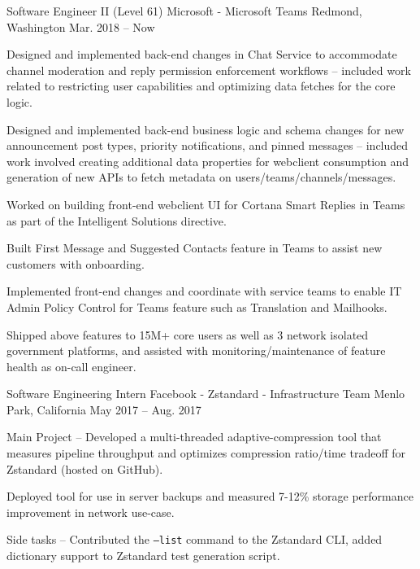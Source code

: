 \begin{cventries}
  \cventry
    {Software Engineer II (Level 61)}
    {Microsoft - Microsoft Teams}
    {Redmond, Washington}
    {Mar. 2018 -- Now}
    {
      \begin{cvitems}
        \item {Designed and implemented back-end changes in Chat Service to accommodate channel moderation and reply permission enforcement workflows -- included work related to restricting user capabilities and optimizing data fetches for the core logic.}
        \item {Designed and implemented back-end business logic and schema changes for new announcement post types, priority notifications, and pinned messages -- included work involved creating additional data properties for webclient consumption and generation of new APIs to fetch metadata on users/teams/channels/messages.}
        \item {Worked on building front-end webclient UI for Cortana Smart Replies in Teams as part of the Intelligent Solutions directive.}
        \item {Built First Message and Suggested Contacts feature in Teams to assist new customers with onboarding.}
        \item {Implemented front-end changes and coordinate with service teams to enable IT Admin Policy Control for Teams feature such as Translation and Mailhooks.}
        \item {Shipped above features to 15M+ core users as well as 3 network isolated government platforms, and assisted with monitoring/maintenance of feature health as on-call engineer.}
      \end{cvitems}
    }
  \cventry
    {Software Engineering Intern}
    {Facebook - Zstandard - Infrastructure Team}
    {Menlo Park, California}
    {May 2017 -- Aug. 2017}
    {
      \begin{cvitems}
        \item {Main Project -- Developed a multi-threaded adaptive-compression tool that measures pipeline throughput and optimizes compression ratio/time tradeoff for Zstandard (hosted on GitHub).}
        \item {Deployed tool for use in server backups and measured 7-12\% storage performance improvement in network use-case.}
        \item {Side tasks -- Contributed the \texttt{--list} command to the Zstandard CLI, added dictionary support to Zstandard test generation script.}

\end{cvitems}}
\end{cventries}
